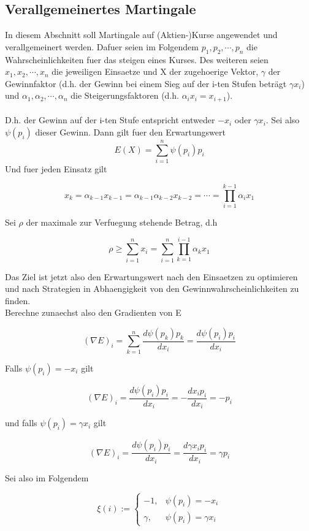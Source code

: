 \documentclass[11pt]{scrartcl}
\begin{document}
		\subsection{Verallgemeinertes Martingale}
			In diesem Abschnitt soll Martingale auf (Aktien-)Kurse angewendet und verallgemeinert werden. Dafuer seien im Folgendem \(p_{1}, p_{2}, \cdots,p_{n}\) die Wahrscheinlichkeiten fuer das steigen eines Kurses. Des weiteren seien \(x_{1}, x_{2}, \cdots,x_{n}\) die jeweiligen Einsaetze und X der zugehoerige Vektor, \(\gamma\) der Gewinnfaktor (d.h. der Gewinn bei einem Sieg auf der i-ten Stufen beträgt \(\gamma x_{i}\)) und \(\alpha_{1}, \alpha_{2}, \cdots,\alpha_{n}\) die Steigerungsfaktoren (d.h. \(\alpha_{i}x_{i}=x_{i+1}\)).\\\\
			D.h. der Gewinn auf der i-ten Stufe entspricht entweder \(-x_{i}\) oder \(\gamma x_{i}\). Sei also \(\psi(p_{i})\) dieser Gewinn. Dann gilt fuer den Erwartungswert
			\[E(X)=\sum_{i=1}^n \psi(p_{i})p_{i}\]
			Und fuer jeden Einsatz gilt
			\begin{center}
				\[x_{k}=\alpha_{k-1}x_{k-1}=\alpha_{k-1}\alpha_{k-2}x_{k-2}=\cdots=\prod_{i=1}^{k-1}\alpha_{i}x_{1}\]
			\end{center}
			Sei \(\rho\) der maximale zur Verfuegung stehende Betrag, d.h
			\begin{center}
				\[\rho \geq \sum_{i=1}^{n}x_{i}=\sum_{i=1}^{n}\prod_{k=1}^{i-1}\alpha_{k}x_{1}\]
			\end{center}
			Das Ziel ist jetzt also den Erwartungswert nach den Einsaetzen zu optimieren und nach Strategien in Abhaengigkeit von den Gewinnwahrscheinlichkeiten zu finden.\\
			Berechne zunaechst also den Gradienten von E
			\begin{center}
				\[(\nabla E)_{i}=\sum_{k=1}^{n}\frac{d\psi(p_{k})p_{k}}{dx_{i}}=\frac{d\psi(p_{i})p_{i}}{dx_{i}}\]
			\end{center}
			Falls \(\psi(p_{i})=-x_{i}\) gilt
			\begin{center}
				\[(\nabla E)_{i}=\frac{d\psi(p_{i})p_{i}}{dx_{i}}=-\frac{dx_{i}p_{i}}{dx_{i}}=-p_{i}\]
			\end{center}
			und falls \(\psi(p_{i})=\gamma x_{i}\) gilt
			\begin{center}
				\[(\nabla E)_{i}=\frac{d\psi(p_{i})p_{i}}{dx_{i}}=\frac{d\gamma x_{i}p_{i}}{dx_{i}}=\gamma p_{i}\]
			\end{center}
			Sei also im Folgendem
			\begin{center}
				\[ \xi(i) :=
					\begin{cases}
						-1, & \psi(p_{i})=-x_{i} \\
						\gamma, & \psi(p_{i})=\gamma x_{i}
					\end{cases}
				\]
			\end{center}
\end{document}
